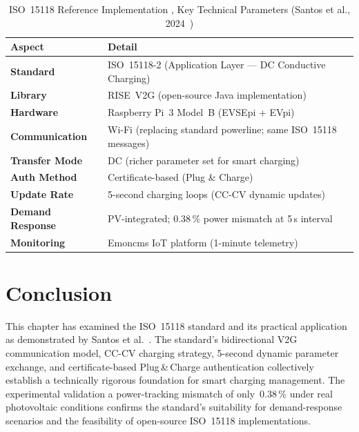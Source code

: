 \documentclass[12pt,a4paper]{report}
\begin{document}
\begin{table}[h!]
  \centering
  \caption{ISO~15118 Reference Implementation , Key Technical Parameters (Santos et al., 2024~\autocite{santos2024})}
  \label{tab:iso15118-summary}
  \renewcommand{\arraystretch}{1.3}
  \begin{tabular}{|>{\bfseries}p{4cm}|p{9cm}|}
    \hline
    Aspect           & Detail \\ \hline
    Standard         & ISO~15118-2 (Application Layer --- DC Conductive Charging)~\autocite{iso15118_2022} \\ \hline
    Library          & RISE~V2G (open-source Java implementation)~\autocite{rise_v2g} \\ \hline
    Hardware         & Raspberry Pi~3 Model~B (EVSEpi + EVpi) \\ \hline
    Communication    & Wi-Fi (replacing standard powerline; same ISO~15118 messages) \\ \hline
    Transfer Mode    & DC (richer parameter set for smart charging) \\ \hline
    Auth Method      & Certificate-based (Plug \& Charge) \\ \hline
    Update Rate      & 5-second charging loops (CC-CV dynamic updates) \\ \hline
    Demand Response  & PV-integrated; 0.38\,\% power mismatch at 5\,s interval \\ \hline
    Monitoring       & Emoncms IoT platform (1-minute telemetry)~\autocite{emoncms} \\ \hline
  \end{tabular}
\end{table}

\section{Conclusion}

This chapter has examined the ISO~15118 standard and its practical application as demonstrated
by Santos et al.~\autocite{santos2024}. The standard's bidirectional V2G communication model,
CC-CV charging strategy, 5-second dynamic parameter exchange, and certificate-based
Plug\,\&\,Charge authentication collectively establish a technically rigorous foundation for
smart charging management. The experimental validation a power-tracking mismatch of
only~0.38\,\% under real photovoltaic conditions confirms the standard's suitability for
demand-response scenarios and the feasibility of open-source ISO~15118 implementations.
\end{document}
